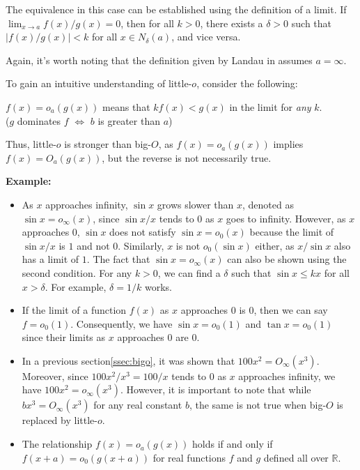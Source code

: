 \documentclass[9pt]{report}
\theoremstyle{definition}
\newcommand\abs[1]{\left\lvert#1\right\rvert}
\begin{document}
The equivalence in this case can be established using the definition of a limit. If \(\lim_{x\to a} f(x)/g(x) = 0\), then for all \(k>0\), there exists a \(\delta > 0\) such that \(\abs{f(x)/g(x)} < k\) for all \(x\in N_{\delta}(a)\), and vice versa.

Again, it's worth noting that the definition given by Landau in \cite{Landau1909} assumes \(a = \infty\).

To gain an intuitive understanding of little-\(o\), consider the following:

\begin{center}
    \(f(x) = o_a(g(x))\) means that \(kf(x) < g(x)\) in the limit for \textit{any} \(k\). \\
    (\(g\) dominates \(f\) \(\iff\) \(b\) is greater than \(a\))
\end{center}

Thus, little-\(o\) is stronger than big-\(O\), as \(f(x) = o_a(g(x))\) implies \(f(x) = O_a(g(x))\), but the reverse is not necessarily true.


\textbf{Example:}

\begin{itemize}
    \item As \(x\) approaches infinity, \(\sin x\) grows slower than \(x\), denoted as \(\sin x = o_{\infty}(x)\), since \(\sin x / x\) tends to \(0\) as \(x\) goes to infinity. However, as \(x\) approaches \(0\), \(\sin x\) does not satisfy \(\sin x = o_0(x)\) because the limit of \(\sin x / x\) is \(1\) and not \(0\). Similarly, \(x\) is not \(o_0(\sin x)\) either, as \(x/\sin x\) also has a limit of \(1\). The fact that \(\sin x = o_{\infty}(x)\) can also be shown using the second condition. For any \(k > 0\), we can find a \(\delta\) such that \(\sin x \leq kx\) for all \(x > \delta\). For example, \(\delta = 1/k\) works.

    \item If the limit of a function \(f(x)\) as \(x\) approaches \(0\) is \(0\), then we can say \(f = o_0(1)\). Consequently, we have \(\sin x = o_0(1)\) and \(\tan x = o_0(1)\) since their limits as \(x\) approaches \(0\) are \(0\).

    \item In a previous section\ref{ssec:bigo}, it was shown that \(100x^2 = O_{\infty}(x^3)\). Moreover, since \(100x^2/x^3 = 100/x\) tends to \(0\) as \(x\) approaches infinity, we have \(100x^2 = o_{\infty}(x^3)\). However, it is important to note that while \(bx^3 = O_{\infty}(x^3)\) for any real constant \(b\), the same is not true when big-$O$ is replaced by little-$o$.

    \item The relationship \(f(x) = o_a(g(x))\) holds if and only if \(f(x+a) = o_0(g(x+a))\) for real functions \(f\) and \(g\) defined all over \(\mathbb{R}\).
\end{itemize}
\end{document}
